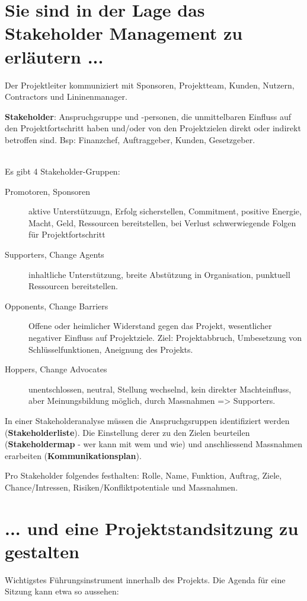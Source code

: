 \section{Sie sind in der Lage das Stakeholder Management zu erläutern ...}
Der Projektleiter kommuniziert mit Sponsoren, Projektteam, Kunden, Nutzern, Contractors und Lininenmanager.

\textbf{Stakeholder}: Anspruchgsruppe und -personen, die unmittelbaren Einfluss auf den Projektfortschritt haben und/oder von den Projektzielen direkt oder indirekt betroffen sind. Bsp: Finanzchef, Auftraggeber, Kunden, Gesetzgeber.

\noindent{}
\\

Es gibt 4 Stakeholder-Gruppen:
\begin{description}
	\item [Promotoren, Sponsoren] aktive Unterstützuugn, Erfolg sicherstellen, Commitment, positive Energie, Macht, Geld, Ressourcen bereitstellen, bei Verlust schwerwiegende Folgen für Projektfortschritt
	\item [Supporters, Change Agents] inhaltliche Unterstützung, breite Abstützung in Organisation, punktuell Ressourcen bereitstellen.
	\item [Opponents, Change Barriers] Offene oder heimlicher Widerstand gegen das Projekt, wesentlicher negativer Einfluss auf Projektziele. Ziel: Projektabbruch, Umbesetzung von Schlüsselfunktionen, Aneignung des Projekts.
	\item [Hoppers, Change Advocates] unentschlossen, neutral, Stellung wechselnd, kein direkter Machteinfluss, aber Meinungsbildung möglich, durch Massnahmen => Supporters.
\end{description}

In einer Stakeholderanalyse müssen die Anspruchgsruppen identifiziert werden (\textbf{Stakeholderliste}). Die Einstellung derer zu den Zielen beurteilen (\textbf{Stakeholdermap} - wer kann mit wem und wie) und anschliessend Massnahmen erarbeiten (\textbf{Kommunikationsplan}).
	
Pro Stakeholder folgendes festhalten: Rolle, Name, Funktion, Auftrag, Ziele, Chance/Intressen, Risiken/Konfliktpotentiale und Massnahmen.


\section{... und eine Projektstandsitzung zu gestalten}
Wichtigstes Führungsinstrument innerhalb des Projekts. Die Agenda für eine Sitzung kann etwa so aussehen:

